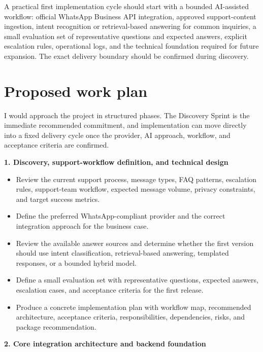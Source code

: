 \documentclass[11pt,a4paper]{article}
\begin{document}
A practical first implementation cycle should start with a bounded AI-assisted workflow: official WhatsApp Business API integration, approved support-content ingestion, intent recognition or retrieval-based answering for common inquiries, a small evaluation set of representative questions and expected answers, explicit escalation rules, operational logs, and the technical foundation required for future expansion. The exact delivery boundary should be confirmed during discovery.\par

\section*{Proposed work plan}

I would approach the project in structured phases. The Discovery Sprint is the immediate recommended commitment, and implementation can move directly into a fixed delivery cycle once the provider, AI approach, workflow, and acceptance criteria are confirmed.\par

\textbf{1. Discovery, support-workflow definition, and technical design}\par

\begin{itemize}
\item Review the current support process, message types, FAQ patterns, escalation rules, support-team workflow, expected message volume, privacy constraints, and target success metrics.
\item Define the preferred WhatsApp-compliant provider and the correct integration approach for the business case.
\item Review the available answer sources and determine whether the first version should use intent classification, retrieval-based answering, templated responses, or a bounded hybrid model.
\item Define a small evaluation set with representative questions, expected answers, escalation cases, and acceptance criteria for the first release.
\item Produce a concrete implementation plan with workflow map, recommended architecture, acceptance criteria, responsibilities, dependencies, risks, and package recommendation.
\end{itemize}

\textbf{2. Core integration architecture and backend foundation}\par
\end{document}
